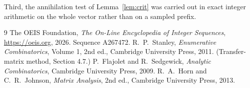\documentclass[11pt,a4paper]{article}
\theoremstyle{plain}
\theoremstyle{definition}
\begin{document}
Third, the annihilation test of Lemma~\ref{lem:crit} was carried out in exact integer
arithmetic on the whole vector rather than on a sampled prefix.

\begin{thebibliography}{9}
 The OEIS Foundation, \emph{The On-Line Encyclopedia of Integer
Sequences}, \url{https://oeis.org}, 2026. Sequence A267472.
 R.~P.~Stanley, \emph{Enumerative Combinatorics}, Volume 1, 2nd ed.,
Cambridge University Press, 2011. (Transfer-matrix method, Section 4.7.)
 P.~Flajolet and R.~Sedgewick, \emph{Analytic Combinatorics}, Cambridge
University Press, 2009.
 R.~A.~Horn and C.~R.~Johnson, \emph{Matrix Analysis}, 2nd ed., Cambridge
University Press, 2013.
\end{thebibliography}
\end{document}

